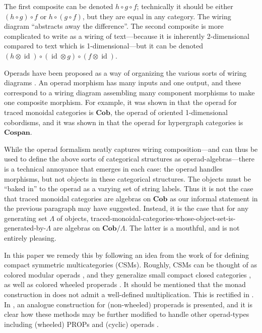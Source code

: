 \documentclass[11pt, article, oneside]{memoir}
\theoremstyle{plain}
\theoremstyle{definition}
\theoremstyle{remark}
\newcommand{\Cat}[1]{\mathbf{#1}}
\DeclareMathOperator{\id}{id}
\newcommand{\Cospan}{\Cat{Cospan}}
\newcommand{\Cob}{\Cat{Cob}}
\begin{document}
The first composite can be denoted $h\circ g\circ f$; technically it should be either $(h\circ g)\circ f$ or $h\circ (g\circ f)$, but they are equal in any category. The wiring diagram ``abstracts away the difference''. The second composite is more complicated to write as a wiring of text---because it is inherently 2-dimensional compared to text which is 1-dimensional---but it can be denoted $(h\otimes\id)\circ(\id\otimes g)\circ(f\otimes\id)$.

Operads have been proposed as a way of organizing the various sorts of wiring diagrams \cite{Spivak:2013b,Rupel.Spivak:2013a}. An operad morphism has many inputs and one output, and these correspond to a wiring diagram assembling many component morphisms to make one composite morphism. For example, it was shown in \cite{Spivak.Schultz.Rupel:2016a} that the operad for traced monoidal categories is $\Cob$, the operad of oriented 1-dimensional cobordisms, and it was shown in \cite{Fong?} that the operad for hypergraph categories is $\Cospan$.

While the operad formalism neatly captures wiring composition---and can thus be used to define the above sorts of categorical structures as operad-algebras---there is a technical annoyance that emerges in each case: the operad handles morphisms, but not objects in these categorical structures. The objects must be ``baked in'' to the operad as a varying set of string labels. Thus it is not the case that traced monoidal categories are algebras on $\Cob$ as our informal statement in the previous paragraph may have suggested. Instead, it is the case that for any generating set $\Lambda$ of objects, traced-monoidal-categories-whose-object-set-is-generated-by-$\Lambda$ are algebras on $\Cob/\Lambda$. The latter is a mouthful, and is not entirely pleasing.


In this paper we remedy this by following an idea from the work of \cite{Joyal.Kock} for defining compact symmetric multicategories (CSMs). Roughly, CSMs can be thought of as colored modular operads \cite{}, and they generalize small compact closed categories \cite{}, as well as colored wheeled properads \cite{}. It should be mentioned that the monad construction in \cite{Joyal.Kock} does not admit a well-defined multiplication. This is rectified in \cite{Raynor:2018a}. In \cite{}, an analogue construction for (non-wheeled) properads is presented, and it is clear how these methods may be further modified to handle other operad-types including (wheeled) PROPs \cite{} and (cyclic) operads \cite{}. 
\end{document}
